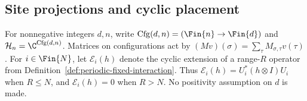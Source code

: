 
\subsection{Site projections and cyclic placement}
\label{sec:mpo_joint_site_projection_embedding}

For nonnegative integers $d,n$, write
$\operatorname{Cfg}(d,n)=(\Fin{n}\to\Fin{d})$ and
$\mathcal H_n=\C^{\operatorname{Cfg}(d,n)}$. Matrices on configurations
act by $(Mv)(\sigma)=\sum_\tau M_{\sigma,\tau}v(\tau)$.
For $i\in\Fin{N}$, let $\mathcal E_i(h)$ denote the cyclic extension
of a range-$R$ operator from Definition~\ref{def:periodic-fixed-interaction}.
Thus $\mathcal E_i(h)=U_i^*(h\otimes I)U_i$ when $R\leq N$, and
$\mathcal E_i(h)=0$ when $R>N$. No positivity assumption on $d$ is made.

